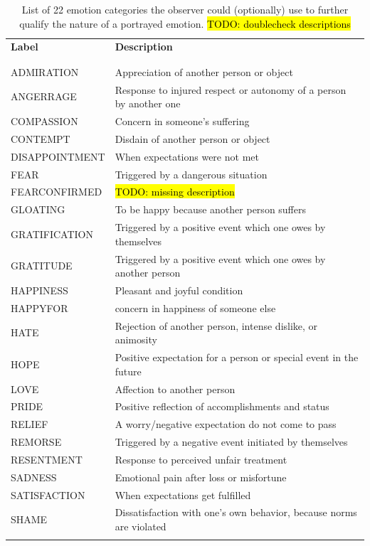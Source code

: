 \documentclass[10pt,a4paper,twocolumn]{article}
\begin{document}
\begin{table}
  \centering
  \begin{tabular}{lp{10cm}}
    \textbf{Label} & \textbf{Description} \\
    \\\hline\\
    ADMIRATION & Appreciation of another person or object \\
    ANGERRAGE & Response to injured respect or autonomy of a person by another one \\
    COMPASSION & Concern in someone's suffering \\
    CONTEMPT & Disdain of another person or object \\
    DISAPPOINTMENT & When expectations were not met \\
    FEAR & Triggered by a dangerous situation \\
    FEARCONFIRMED & \hl{TODO: missing description}\\
    GLOATING & To be happy because another person suffers \\
    GRATIFICATION & Triggered by a positive event which one owes by themselves  \\
    GRATITUDE & Triggered by a positive event which one owes by another person \\
    HAPPINESS & Pleasant and joyful condition \\
    HAPPYFOR & concern in happiness of someone else \\
    HATE & Rejection of another person, intense dislike, or animosity \\
    HOPE & Positive expectation for a person or special event in the future \\
    LOVE & Affection to another person \\
    PRIDE & Positive reflection of accomplishments and status \\
    RELIEF & A worry/negative expectation do not come to pass \\
    REMORSE & Triggered by a negative event initiated by themselves \\
    RESENTMENT & Response to perceived unfair treatment \\
    SADNESS & Emotional pain after loss or misfortune \\
    SATISFACTION & When expectations get fulfilled \\
    SHAME & Dissatisfaction with one's own behavior, because norms are violated \\
    \\\hline
  \end{tabular}
  \caption{List of 22 emotion categories the observer could (optionally) use to
    further qualify the nature of a portrayed emotion. \hl{TODO: doublecheck descriptions}}
  \label{tab:emotion_categories}
\end{table}
\end{document}
